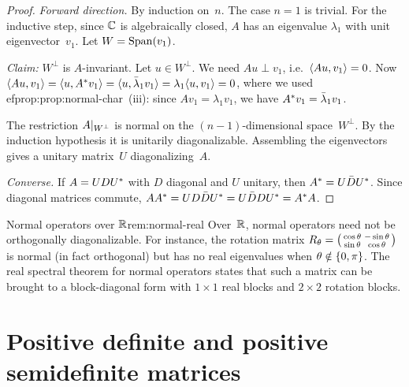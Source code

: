 \begin{proof}
\emph{Forward direction.}  By induction on~$n$.  The case $n=1$ is
trivial.  For the inductive step, since ${\mathbb{C}}$ is algebraically closed,
$A$ has an eigenvalue $\lambda_1$ with unit eigenvector~$v_1$.
Let $W=\operatorname{Span}(v_1)$.

\emph{Claim:} $W^\perp$ is $A$-invariant.  Let $u\in W^\perp$.  We need
$Au\perp v_1$, i.e.\ $\langle Au,v_1\rangle=0$.  Now
$\langle Au,v_1\rangle = \langle u,{A}^{*}v_1\rangle = \langle u,\bar\lambda_1 v_1\rangle
= \lambda_1\langle u,v_1\rangle = 0$,
where we used 
ef{prop:prop:normal-char}~(iii): since $Av_1=\lambda_1 v_1$,
we have ${A}^{*}v_1=\bar\lambda_1 v_1$.

The restriction $A{|_{W^\perp}}$ is normal on the $(n-1)$-dimensional
space~$W^\perp$.  By the induction hypothesis it is unitarily
diagonalizable.  Assembling the eigenvectors gives a unitary matrix~$U$
diagonalizing~$A$.

\emph{Converse.}  If $A = U D {U}^{*}$ with $D$ diagonal and $U$
unitary, then ${A}^{*} = U\bar D{U}^{*}$.  Since diagonal
matrices commute, $A{A}^{*} = UD\bar D{U}^{*}
= U\bar D D{U}^{*} = {A}^{*}A$.
\end{proof}

\begin{remark}{Normal operators over ${\mathbb{R}}$}{rem:normal-real}
Over~${\mathbb{R}}$, normal operators need not be orthogonally diagonalizable.
For instance, the rotation matrix
$R_\theta = \begin{psmallmatrix}\cos\theta & -\sin\theta \\
\sin\theta & \cos\theta\end{psmallmatrix}$
is normal (in fact orthogonal) but has no real eigenvalues when
$\theta\notin\left\{0,\pi\right\}$.  The real spectral theorem for normal
operators states that such a matrix can be brought to a block-diagonal
form with $1\times 1$ real blocks and $2\times 2$ rotation blocks.
\end{remark}


\section{Positive definite and positive semidefinite matrices}%
\label{sec:positive-definite}

